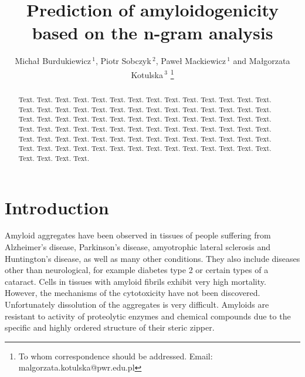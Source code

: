 \documentclass[a4,center,fleqn]{NAR}
\begin{document}
\title{Prediction of amyloidogenicity based on the n-gram analysis}

\author{Micha\l{} Burdukiewicz\,$^{1}$, Piotr Sobczyk\,$^{2}$, Pawe\l{} Mackiewicz\,$^{1}$ and Ma\l{}gorzata Kotulska\,$^{3}$
\footnote{To whom correspondence should be addressed.
Email: malgorzata.kotulska@pwr.edu.pl}}

\address{
$^{1}$University of Wroc\l{}aw, Department of Genomics,
$^{2}$Wroc\l{}aw University of Science and Technology, Department of Mathematics and 
$^{3}$Wroc\l{}aw University of Science and Technology, Department of Biomedical Engineering, Faculty of Fundamental Problems of Technology
}


\maketitle

\begin{abstract}
Text. Text. Text. Text. Text. Text. Text. Text. Text. Text. Text.
Text. Text. Text. Text. Text. Text. Text. Text. Text. Text. Text.
Text. Text. Text. Text. Text. Text. Text. Text. Text. Text. Text.
Text. Text. Text. Text. Text. Text. Text. Text. Text. Text. Text.
Text. Text. Text. Text. Text. Text. Text. Text. Text. Text. Text.
Text. Text. Text. Text. Text. Text. Text. Text. Text. Text. Text.
Text. Text. Text. Text. Text. Text. Text. Text. Text. Text. Text.
Text. Text. Text. Text. Text. Text. Text. Text. Text. Text. Text.
\end{abstract}

\section{Introduction}


Amyloid aggregates have been observed in tissues of people suffering from 
Alzheimer's disease, Parkinson's disease, amyotrophic lateral sclerosis and 
Huntington's disease, as well as many other conditions. They also include 
diseases other than neurological, for example diabetes type 2 or certain types 
of a cataract. Cells in tissues with amyloid fibrils exhibit very high 
mortality. However, the mechanisms of the cytotoxicity have not been discovered. 
Unfortunately dissolution of the aggregates is very difficult. Amyloids are 
resistant to activity of proteolytic enzymes and chemical compounds due to the 
specific and highly ordered structure of their steric zipper.
\end{document}
